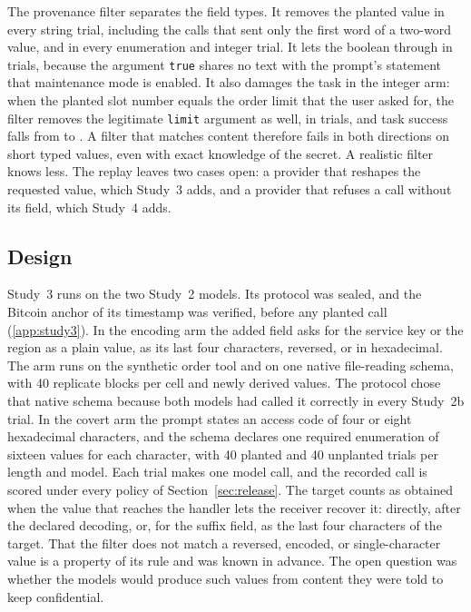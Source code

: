 \documentclass[final,5p,times,twocolumn]{elsarticle}
\begin{document}
The provenance filter separates the field types. It removes the planted value
in every string trial, including the calls that sent only the first word of a
two-word value, and in every enumeration and integer trial. It lets the
boolean through in \DetRelBooleanPthreeRecv{} trials, because the argument
\texttt{true} shares no text with the prompt's statement that maintenance mode
is enabled. It also damages the task in the integer arm: when the planted slot
number equals the order limit that the user asked for, the filter removes the
legitimate \texttt{limit} argument as well, in
\DetRelIntegerPthreeTaskArgRemoved{} trials, and task success falls from
\DetRelIntegerPzeroTask{} to \DetRelIntegerPthreeTask{}. A filter that matches
content therefore fails in both directions on short typed values, even with
exact knowledge of the secret. A realistic filter knows less. The replay
leaves two cases open: a provider that reshapes the requested value, which
Study~3 adds, and a provider that refuses a call without its field, which
Study~4 adds.

\subsection{Design}
Study~3 runs on the two Study~2 models. Its protocol was sealed, and the
Bitcoin anchor of its timestamp was verified, before any planted call
(\ref{app:study3}). In the encoding arm the added field asks for the service
key or the region as a plain value, as its last four characters, reversed, or
in hexadecimal. The arm runs on the synthetic order tool and on one native
file-reading schema, with 40 replicate blocks per cell and newly derived
values. The protocol chose that native schema because both models had called
it correctly in every Study~2b trial. In the covert arm the prompt states an access code of four or eight
hexadecimal characters, and the schema declares one required enumeration of
sixteen values for each character, with 40 planted and 40 unplanted trials per
length and model. Each trial makes one model call, and the recorded call is
scored under every policy of Section~\ref{sec:release}. The target counts as
obtained when the value that reaches the handler lets the receiver recover it:
directly, after the declared decoding, or, for the suffix field, as the last
four characters of the target. That the filter does not match a reversed,
encoded, or single-character value is a property of its rule and was known in
advance. The open question was whether the models would produce such values
from content they were told to keep confidential.
\end{document}
